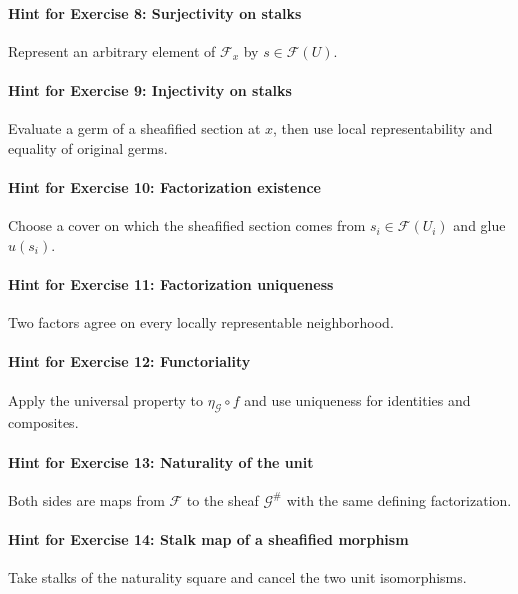 \paragraph{Hint for Exercise 8: Surjectivity on stalks}\mbox{}\par
Represent an arbitrary element of $\mathcal F_x$ by $s\in\mathcal F(U)$.


\paragraph{Hint for Exercise 9: Injectivity on stalks}\mbox{}\par
Evaluate a germ of a sheafified section at $x$, then use local representability and equality of original germs.


\paragraph{Hint for Exercise 10: Factorization existence}\mbox{}\par
Choose a cover on which the sheafified section comes from $s_i\in\mathcal F(U_i)$ and glue $u(s_i)$.


\paragraph{Hint for Exercise 11: Factorization uniqueness}\mbox{}\par
Two factors agree on every locally representable neighborhood.


\paragraph{Hint for Exercise 12: Functoriality}\mbox{}\par
Apply the universal property to $\eta_\mathcal G\circ f$ and use uniqueness for identities and composites.


\paragraph{Hint for Exercise 13: Naturality of the unit}\mbox{}\par
Both sides are maps from $\mathcal F$ to the sheaf $\mathcal G^\#$ with the same defining factorization.


\paragraph{Hint for Exercise 14: Stalk map of a sheafified morphism}\mbox{}\par
Take stalks of the naturality square and cancel the two unit isomorphisms.


